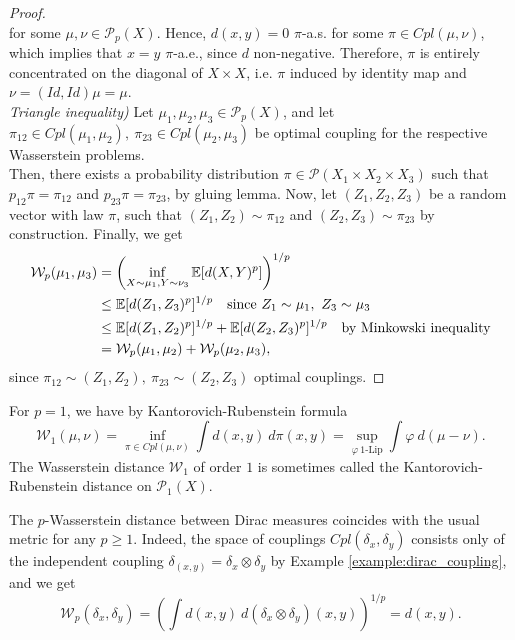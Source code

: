 \documentclass[../main.tex]{subfiles}
\begin{document}
\begin{proof}
$$    $$
    for some $\mu, \nu\in\mathcal{P}_p(X)$. Hence, $d(x, y) = 0$ $\pi$-a.s. for some $\pi\in Cpl(\mu, \nu)$, which implies that $x=y$ $\pi$-a.e., since $d$ non-negative. Therefore, $\pi$ is entirely concentrated on the diagonal of $X\times X$, i.e. $\pi$ induced by identity map and $\nu = (Id, Id)\mu = \mu$. \\
    \textit{Triangle inequality)} Let $\mu_1, \mu_2, \mu_3\in\mathcal{P}_p(X)$, and let $\pi_{12}\in Cpl(\mu_1, \mu_2), \ \pi_{23}\in Cpl(\mu_2, \mu_3)$ be optimal coupling for the respective Wasserstein problems. \\
    Then, there exists a probability distribution $\pi\in\mathcal{P}(X_1 \times X_2 \times X_3)$ such that $p_{12}\pi = \pi_{12}$ and $p_{23}\pi = \pi_{23}$, by gluing lemma. Now, let $(Z_1, Z_2, Z_3)$ be a random vector with law $\pi$, such that $(Z_1, Z_2)\sim\pi_{12}$ and $(Z_2, Z_3)\sim\pi_{23}$ by construction. Finally, we get
    \begin{align*}
        \mathcal{W}_p(\mu_1, \mu_3) 
        &= \left(\inf_{X\sim\mu_1, Y\sim\nu_3} \mathbb{E}[d(X, Y)^p]\right)^{1/p} \\
        &\leq \mathbb{E}[d(Z_1, Z_3)^p]^{1/p} \quad \text{since } Z_1\sim\mu_1, \ Z_3\sim\mu_3\\
        &\leq  \mathbb{E}[d(Z_1, Z_2)^p]^{1/p} + \mathbb{E}[d(Z_2, Z_3)^p]^{1/p} \quad \text{by Minkowski inequality} \\
        &= \mathcal{W}_p(\mu_1, \mu_2) + \mathcal{W}_p(\mu_2, \mu_3),
    \end{align*} 
    since $\pi_{12}\sim (Z_1, Z_2), \ \pi_{23}\sim (Z_2, Z_3)$ optimal couplings.
\end{proof}

\begin{remark}
    For $p=1$, we have by Kantorovich-Rubenstein formula 
    $$
    \mathcal{W}_1(\mu, \nu) = \inf_{\pi\in Cpl(\mu, \nu)} \int d(x, y) \ d\pi(x, y) = \sup_{\varphi \ 1\text{-Lip}} \int \varphi \ d(\mu - \nu).
    $$
    The Wasserstein distance $\mathcal{W}_1$ of order $1$ is sometimes called the Kantorovich-Rubenstein distance on $\mathcal{P}_1(X)$.
\end{remark}

\begin{example}
    The $p$-Wasserstein distance between Dirac measures coincides with the usual metric for any $p\geq 1$. Indeed, the space of couplings $Cpl(\delta_x, \delta_y)$ consists only of the independent coupling $\delta_{(x, y)} = \delta_x \otimes \delta_y$ by Example \ref{example:dirac_coupling}, and we get
    $$
    \mathcal{W}_p(\delta_{x}, \delta_y) = \left(\int d(x, y) \ d(\delta_{x}\otimes\delta_y)(x, y)\right)^{1/p} = d(x, y).
    $$
\end{example}
\end{document}
